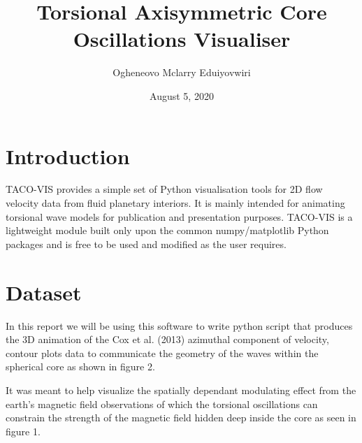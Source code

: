 \documentclass{article}
\title{Torsional Axisymmetric Core Oscillations Visualiser}
\author{Ogheneovo Mclarry Eduiyovwiri}
\date{August 5, 2020}
\begin{document}
\maketitle
\section{Introduction}
TACO-VIS provides a simple set of Python visualisation tools for 2D flow velocity data from fluid planetary interiors. It is mainly intended for animating torsional wave models for publication and presentation purposes. TACO-VIS is a lightweight module built only upon the common numpy/matplotlib Python packages and is free to be used and modified as the user requires.


\section{Dataset}

In this report we will be using this software to write python script that produces the 3D animation of the Cox et al. (2013) azimuthal component of velocity, contour plots data to communicate the geometry of the waves within the spherical core as shown in figure 2.

It was meant to help visualize the spatially dependant modulating effect from the earth's magnetic field observations of which the torsional oscillations can constrain the strength of the magnetic field hidden deep inside the core as seen in figure 1.
\end{document}
